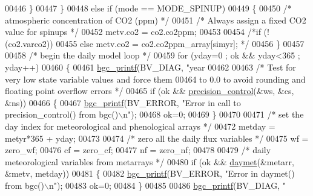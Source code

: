 \begin{DoxyCode}
{{{{{{00446             \}
00447         \}
00448         \textcolor{keywordflow}{else} \textcolor{keywordflow}{if} (mode == MODE\_SPINUP)
00449         \{
00450             \textcolor{comment}{/* atmospheric concentration of CO2 (ppm) */}
00451             \textcolor{comment}{/* Always assign a fixed CO2 value for spinups */}
00452             metv.co2 = co2.co2ppm;
00453 
00454             \textcolor{comment}{/*if (!(co2.varco2)) }
00455 \textcolor{comment}{            else metv.co2 = co2.co2ppm\_array[simyr]; */}
00456         \}
00457 
00458         \textcolor{comment}{/* begin the daily model loop */}
00459         \textcolor{keywordflow}{for} (yday=0 ; ok && yday<365 ; yday++)
00460         \{
00461             \hyperlink{bgc__io_8c_af287cce6e2aede1ce337de9319e80d0d}{bgc\_printf}(BV\_DIAG, \textcolor{stringliteral}{"year %
00462             
00463             \textcolor{comment}{/* Test for very low state variable values and force them}
00464 \textcolor{comment}{            to 0.0 to avoid rounding and floating point overflow errors */}
00465             \textcolor{keywordflow}{if} (ok && \hyperlink{precision__control_8c_a20e713bc8669fc41d516c218ef848e01}{precision\_control}(&ws, &cs, &ns))
00466             \{
00467                 \hyperlink{bgc__io_8c_af287cce6e2aede1ce337de9319e80d0d}{bgc\_printf}(BV\_ERROR, \textcolor{stringliteral}{"Error in call to precision\_control() from bgc()\(\backslash\)n"});
00468                 ok=0;
00469             \} 
00470             
00471             \textcolor{comment}{/* set the day index for meteorological and phenological arrays */}
00472             metday = metyr*365 + yday;
00473             
00474             \textcolor{comment}{/* zero all the daily flux variables */}
00475             wf = zero\_wf;
00476             cf = zero\_cf;
00477             nf = zero\_nf;
00478 
00479             \textcolor{comment}{/* daily meteorological variables from metarrays */}
00480             \textcolor{keywordflow}{if} (ok && \hyperlink{daymet_8c_a6bd13f3e81d358675fd203d695b05630}{daymet}(&metarr, &metv, metday))
00481             \{
00482                 \hyperlink{bgc__io_8c_af287cce6e2aede1ce337de9319e80d0d}{bgc\_printf}(BV\_ERROR, \textcolor{stringliteral}{"Error in daymet() from bgc()\(\backslash\)n"});
00483                 ok=0;
00484             \}
00485             
00486             \hyperlink{bgc__io_8c_af287cce6e2aede1ce337de9319e80d0d}{bgc\_printf}(BV\_DIAG, \textcolor{stringliteral}{"%
}}}}}}}}
\end{DoxyCode}

